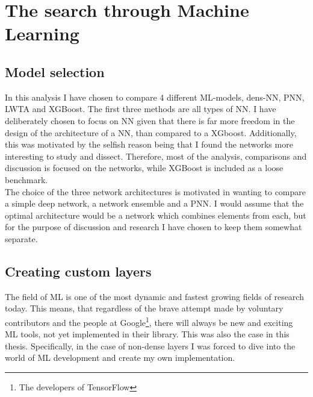 \section{The search through Machine Learning}
\subsection{Model selection}
In this analysis I have chosen to compare 4 different \ac{ML}-models, dens-\acf{NN}, \acf{PNN},
\ac{LWTA} and XGBoost. The first three methods are all types of \ac{NN}. I have deliberately 
chosen to focus on \ac{NN} given that there is far more freedom in the design of the architecture
of a \ac{NN}, than compared to a XGboost. Additionally, this was motivated by the selfish reason
being that I found the networks more interesting to study and dissect. Therefore, most of the 
analysis, comparisons and discussion is focused on the networks, while XGBoost is included 
as a loose benchmark. 
\\
The choice of the three network architectures is motivated in wanting to compare a simple 
deep network, a network ensemble and a \ac{PNN}. I would assume that the optimal architecture
would be a network which combines elements from each, but for the purpose of discussion
and research I have chosen to keep them somewhat separate. 
\subsection{Creating custom layers}\label{subsec:CustomLayer}
The field of \ac{ML} is one of the most dynamic and fastest growing fields of research
today. This means, that regardless of the brave attempt made by voluntary contributors and
the people at Google\footnote{The developers of TensorFlow}, there will always be 
new and exciting \ac{ML} tools, not yet implemented in their library. This was also 
the case in this thesis. Specifically, in the case of non-dense layers I was forced
to dive into the world of \ac{ML} development and create my own implementation. 
